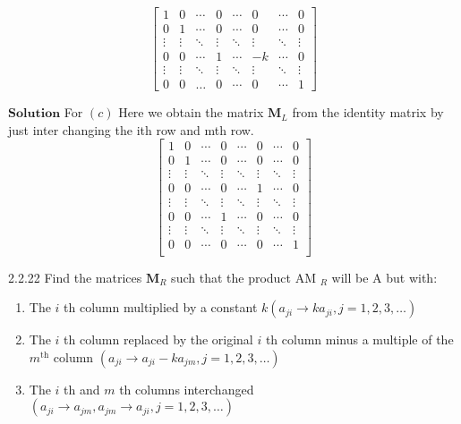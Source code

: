 \documentclass{styles/kaobook}
\begin{document}
$$\begin{bmatrix}
1 & 0 & \cdots & 0 & \cdots & 0&\cdots&0 \\ 
0 & 1 & \cdots  & 0 & \cdots &0&\cdots& 0\\ 
\vdots & \vdots & \ddots & \vdots & \ddots &\vdots&\ddots &\vdots\\ 
0 & 0 & \cdots & 1 &\cdots & -k &\cdots &0 \\ 
\vdots & \vdots & \ddots & \vdots  &\ddots &\vdots &\ddots &\vdots\\
0&0&\dots&0&\cdots&0&\cdots&1
\end{bmatrix}$$

$\boxed{\textbf{Solution}}$  For $(c)$ Here we obtain the matrix $\mathbf{M}_{L}$ from the identity matrix by just inter changing the ith row and mth row.
$$\begin{bmatrix}
1& 0  &\cdots  & 0 & \cdots & 0 & \cdots &0 \\ 
0&1  &\cdots  &0  & \cdots & 0 & \cdots & 0\\ 
\vdots& \vdots & \ddots & \vdots & \ddots & \vdots & \ddots& \vdots\\ 
0 & 0 & \cdots &0  &\cdots  & 1 & \cdots & 0\\ 
 \vdots& \vdots & \ddots & \vdots & \ddots & \vdots & \ddots& \vdots\\ 
0 & 0 & \cdots &1  &\cdots  & 0 & \cdots & 0\\ 
 \vdots& \vdots & \ddots & \vdots & \ddots & \vdots & \ddots& \vdots\\  
0 & 0 & \cdots &0  &\cdots  & 0 & \cdots & 1\\ 
\end{bmatrix}$$





\begin{greenbox}{2.2.22}
Find the matrices $\mathbf{M}_{R}$ such that the product AM $_{R}$ will be A but with:

\begin{enumerate}[$(a)$]
\item The $i$ th column multiplied by a constant $k\left(a_{j i} \rightarrow k a_{j i}, j=1,2,3, \ldots\right)$
\item The $i$ th column replaced by the original $i$ th column minus a multiple of the $m^{\text{th}}$ column $\left(a_{j i} \rightarrow a_{j i}-k a_{j m}, j=1,2,3, \ldots\right)$
\item The $i$ th and $m$ th columns interchanged $\left(a_{j i} \rightarrow a_{j m}, a_{j m} \rightarrow a_{j i}, j=1,2,3, \ldots\right)$
\end{enumerate}
\end{greenbox}
\end{document}
